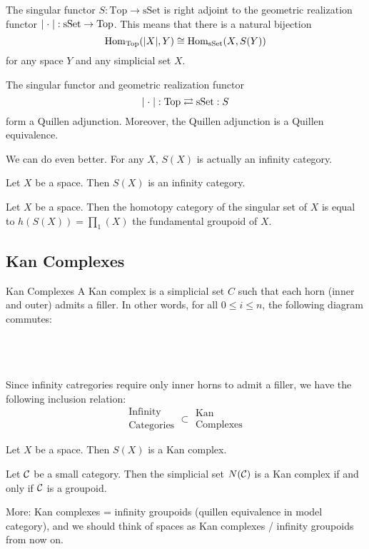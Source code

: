 \documentclass[a4paper]{article}
\begin{document}
\begin{thm}{}{} The singular functor $S:\text{Top}\to\text{sSet}$ is right adjoint to the geometric realization functor $\abs{\;\cdot\;}:\text{sSet}\to\text{Top}$. This means that there is a natural bijection $$\operatorname{Hom}_\text{Top}(\abs{X},Y)\cong\operatorname{Hom}_\text{sSet}(X,S(Y))$$ for any space $Y$ and any simplicial set $X$. 
\end{thm}

\begin{thm}{}{} The singular functor and geometric realization functor $$\abs{\;\cdot\;}:\text{Top}\rightleftarrows\text{sSet}:S$$ form a Quillen adjunction. Moreover, the Quillen adjunction is a Quillen equivalence. 
\end{thm}

We can do even better. For any $X$, $S(X)$ is actually an infinity category. 

\begin{lmm}{}{} Let $X$ be a space. Then $S(X)$ is an infinity category. 
\end{lmm}

\begin{prp}{}{} Let $X$ be a space. Then the homotopy category of the singular set of $X$ is equal to $h(S(X))=\prod_1(X)$ the fundamental groupoid of $X$. 
\end{prp}

\subsection{Kan Complexes}
\begin{defn}{Kan Complexes}{} A Kan complex is a simplicial set $C$ such that each horn (inner and outer) admits a filler. In other words, for all $0\leq i\leq n$, the following diagram commutes: \\~\\
\\~\\
\end{defn}

Since infinity catregories require only inner horns to admit a filler, we have the following inclusion relation: $$\substack{\text{Infinity}\\\text{Categories}}\subset\substack{\text{Kan}\\\text{Complexes}}$$

\begin{prp}{}{} Let $X$ be a space. Then $S(X)$ is a Kan complex. 
\end{prp}

\begin{thm}{}{} Let $\mathcal{C}$ be a small category. Then the simplicial set $N(\mathcal{C})$ is a Kan complex if and only if $\mathcal{C}$ is a groupoid. 
\end{thm}

More: Kan complexes = infinity groupoids (quillen equivalence in model category), and we should think of spaces as Kan complexes / infinity groupoids from now on. 
\end{document}
